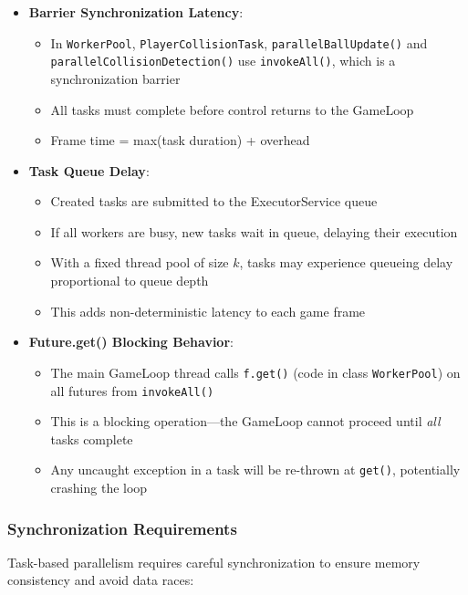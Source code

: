 \documentclass[12pt,a4paper]{article}
\begin{document}
\begin{itemize}
    \item \textbf{Barrier Synchronization Latency}:
    \begin{itemize}
        \item In \texttt{WorkerPool}, \texttt{PlayerCollisionTask}, \texttt{parallelBallUpdate()} and \texttt{parallelCollisionDetection()} use \texttt{invokeAll()}, which is a synchronization barrier
        \item All tasks must complete before control returns to the GameLoop
        \item Frame time = max(task duration) + overhead
    \end{itemize}
    
    \item \textbf{Task Queue Delay}:
    \begin{itemize}
        \item Created tasks are submitted to the ExecutorService queue
        \item If all workers are busy, new tasks wait in queue, delaying their execution
        \item With a fixed thread pool of size $k$, tasks may experience queueing delay proportional to queue depth
        \item This adds non-deterministic latency to each game frame
    \end{itemize}
    
    \item \textbf{Future.get() Blocking Behavior}:
    \begin{itemize}
        \item The main GameLoop thread calls \texttt{f.get()} (code in class \texttt{WorkerPool}) on all futures from \texttt{invokeAll()}
        \item This is a blocking operation---the GameLoop cannot proceed until \textit{all} tasks complete
        \item Any uncaught exception in a task will be re-thrown at \texttt{get()}, potentially crashing the loop
    \end{itemize}
\end{itemize}

\subsubsection{Synchronization Requirements}
Task-based parallelism requires careful synchronization to ensure memory consistency and avoid data races:
 
\end{document}
